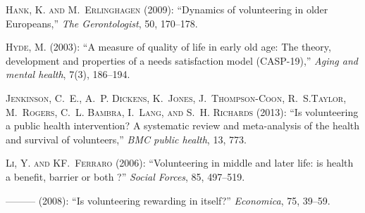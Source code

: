 \documentclass[10pt, letterpaper]{article}
\begin{document}
\begin{spacing}{1.4}
\begin{thebibliography}{87}
  
\textsc{Hank, K. and M.~Erlinghagen} (2009): \enquote{Dynamics of volunteering in older Europeans,} \emph{The Gerontologist}, 50, 170--178.  

\textsc{Hyde, M.} (2003): \enquote{A measure of quality of life in early old age: The theory, development and properties of a needs satisfaction model (CASP-19),} \emph{Aging and mental health}, 7(3), 186--194. 


\textsc{Jenkinson, C.~E., A.~P. Dickens, K.~Jones, J.~Thompson-Coon, R.~S.Taylor, M.~Rogers, C.~L. Bambra, I.~Lang, and S.~H. Richards} (2013):
  \enquote{Is volunteering a public health intervention? A systematic review and meta-analysis of the health and survival of volunteers,} \emph{BMC public health}, 13, 773.


\textsc{Li, Y. and KF.~Ferraro} (2006): \enquote{Volunteering in middle and later life: is health a benefit, barrier or both ?} \emph{Social Forces}, 85, 497--519. 


---\hspace{-.1pt}---\hspace{-.1pt}--- (2008{}): \enquote{Is volunteering rewarding in itself?} \emph{Economica}, 75, 39--59.


\end{thebibliography}
\end{spacing}
\end{document}
